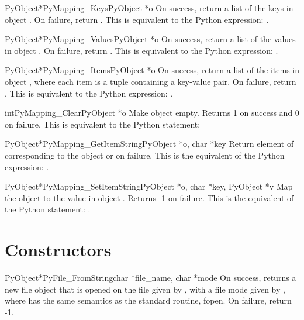 \documentclass[twoside,openright]{report}
\begin{document}
\begin{cfuncdesc}{PyObject*}{PyMapping_Keys}{PyObject *o}
On success, return a list of the keys in object .  On
failure, return \NULL{}. This is equivalent to the Python
expression: .
\end{cfuncdesc}


\begin{cfuncdesc}{PyObject*}{PyMapping_Values}{PyObject *o}
On success, return a list of the values in object .  On
failure, return \NULL{}. This is equivalent to the Python
expression: .
\end{cfuncdesc}


\begin{cfuncdesc}{PyObject*}{PyMapping_Items}{PyObject *o}
On success, return a list of the items in object , where
each item is a tuple containing a key-value pair.  On
failure, return \NULL{}. This is equivalent to the Python
expression: .
\end{cfuncdesc}

\begin{cfuncdesc}{int}{PyMapping_Clear}{PyObject *o}
Make object  empty.  Returns 1 on success and 0 on failure.
This is equivalent to the Python statement:
\end{cfuncdesc}


\begin{cfuncdesc}{PyObject*}{PyMapping_GetItemString}{PyObject *o, char *key}
Return element of  corresponding to the object  or \NULL{}
on failure. This is the equivalent of the Python expression:
.
\end{cfuncdesc}

\begin{cfuncdesc}{PyObject*}{PyMapping_SetItemString}{PyObject *o, char *key, PyObject *v}
Map the object  to the value  in object .  Returns 
-1 on failure.  This is the equivalent of the Python
statement: .
\end{cfuncdesc}


\section{Constructors}

\begin{cfuncdesc}{PyObject*}{PyFile_FromString}{char *file_name, char *mode}
On success, returns a new file object that is opened on the
file given by , with a file mode given by ,
where  has the same semantics as the standard \C{} routine,
fopen.  On failure, return -1.
\end{cfuncdesc}
\end{document}
